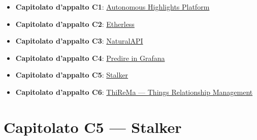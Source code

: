 \documentclass{article}
\begin{document}
\begin{itemize}
  \item \textbf{Capitolato d'appalto C1}: \href{https://www.math.unipd.it/~tullio/IS-1/2019/Progetto/C1.pdf}{Autonomous Highlights Platform}
  \item \textbf{Capitolato d'appalto C2}: \href{https://www.math.unipd.it/~tullio/IS-1/2019/Progetto/C2.pdf}{Etherless}
  \item \textbf{Capitolato d'appalto C3}: \href{https://www.math.unipd.it/~tullio/IS-1/2019/Progetto/C3.pdf}{NaturalAPI}
  \item \textbf{Capitolato d'appalto C4}: \href{https://www.math.unipd.it/~tullio/IS-1/2019/Progetto/C4.pdf}{Predire in Grafana}
  \item \textbf{Capitolato d'appalto C5}: \href{https://www.math.unipd.it/~tullio/IS-1/2019/Progetto/C5.pdf}{Stalker}
  \item \textbf{Capitolato d'appalto C6}: \href{https://www.math.unipd.it/~tullio/IS-1/2019/Progetto/C6.pdf}{ThiReMa --- Things Relationship Management}
\end{itemize}

%

\newpage
\section{Capitolato C5 --- Stalker}%
\label{sec:c5}

\end{document}
